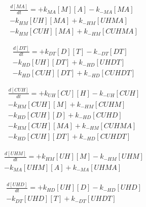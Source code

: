 \begin{equation}
\begin{split}
\frac{d[MA]}{dt} = + k_{MA}[M][A] - k_{-MA}[MA]\\ %
                   - k_{HM}[UH][MA] + k_{-HM}[UHMA] \\%
                   - k_{HM}[CUH][MA] + k_{-HM}[CUHMA] %
\end{split}
\end{equation}

\begin{equation}
\begin{split}
\frac{d[DT]}{dt} = + k_{DT}[D][T] - k_{-DT}[DT] \\%
                   - k_{HD}[UH][DT] + k_{-HD}[UHDT] \\%
                   - k_{HD}[CUH][DT] + k_{-HD}[CUHDT] %
\end{split}               
\end{equation}

\begin{equation}
\begin{split}
\frac{d[CUH]}{dt} = + k_{UH}[CU][H] - k_{-UH}[CUH] \\%
                    - k_{HM}[CUH][M] + k_{-HM}[CUHM] \\%
                    - k_{HD}[CUH][D] + k_{-HD}[CUHD] \\%
                    - k_{HM}[CUH][MA] + k_{-HM}[CUHMA] \\%
                    - k_{HD}[CUH][DT] + k_{-HD}[CUHDT] %
\end{split}
\end{equation}

\begin{equation}
\begin{split}
\frac{d[UHM]}{dt} = + k_{HM}[UH][M] - k_{-HM}[UHM] \\%
                    - k_{MA}[UHM][A] + k_{-MA}[UHMA] %
\end{split}
\end{equation}

\begin{equation}
\begin{split}
\frac{d[UHD]}{dt} = + k_{HD}[UH][D] - k_{-HD}[UHD] \\%
                    - k_{DT}[UHD][T] + k_{-DT}[UHDT] %
\end{split}
\end{equation}

